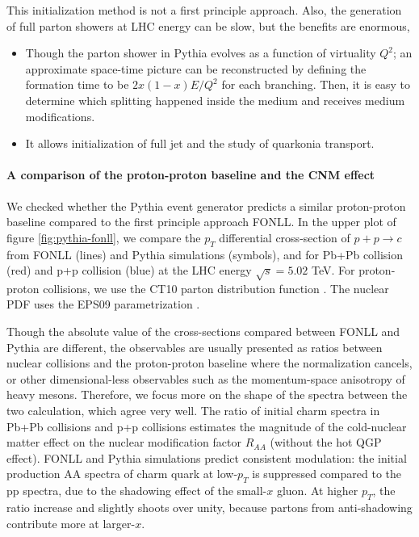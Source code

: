 This initialization method is not a first principle approach. 
Also, the generation of full parton showers at LHC energy can be slow, but the benefits are enormous,
\begin{itemize}
\item Though the parton shower in Pythia evolves as a function of virtuality $Q^2$; an approximate space-time picture can be reconstructed by defining the formation time to be $2x(1-x)E/Q^2$ for each branching. Then, it is easy to determine which splitting happened inside the medium and receives medium modifications.
\item It allows initialization of full jet and the study of quarkonia transport.
\end{itemize}

\paragraph{A comparison of the proton-proton baseline and the CNM effect}
We checked whether the Pythia event generator predicts a similar proton-proton baseline compared to the first principle approach FONLL.
In the upper plot of figure \ref{fig:pythia-fonll}, we compare the $p_T$ differential cross-section of $p+p\rightarrow c$ from FONLL (lines) and Pythia simulations (symbols), and for Pb+Pb collision (red) and p+p collision (blue) at the LHC energy $\sqrt{s}=5.02$ TeV.
For proton-proton collisions, we use the CT10 parton distribution function \cite{Lai:2010vv}.
The nuclear PDF uses the EPS09 parametrization \cite{Eskola:2009uj}.

Though the absolute value of the cross-sections compared between FONLL and Pythia are different, the observables are usually presented as ratios between nuclear collisions and the proton-proton baseline where the normalization cancels, or other dimensional-less observables such as the momentum-space anisotropy of heavy mesons.
Therefore, we focus more on the shape of the spectra between the two calculation, which agree very well.
The ratio of initial charm spectra in Pb+Pb collisions and p+p collisions estimates the magnitude of the cold-nuclear matter effect on the nuclear modification factor $R_{AA}$ (without the hot QGP effect).
FONLL and Pythia simulations predict consistent modulation: the initial production AA spectra of charm quark at low-$p_T$ is suppressed compared to the pp spectra, due to the shadowing effect of the small-$x$ gluon. 
At higher $p_T$, the ratio increase and slightly shoots over unity, because partons from anti-shadowing contribute more at larger-$x$.

